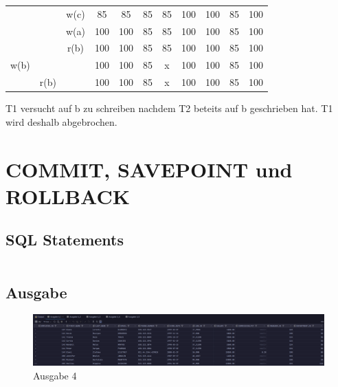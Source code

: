 \documentclass[12pt]{scrartcl}
\begin{document}
\begin{center}
\begin{tabular}{ | c | c | c | c | c | c | c | c | c | c | c | }
		     &      & w(c) & 85                        & 85                          & 85                          & 85                          & 100  & 100  & 85   & 100  \\
		     &      & w(a) & 100                       & 100                         & 85                          & 85                          & 100  & 100  & 85   & 100  \\
		     &      & r(b) & 100                       & 100                         & 85                          & 85                          & 100  & 100  & 85   & 100  \\
		w(b) &      &      & 100                       & 100                         & 85                          & x                           & 100  & 100  & 85   & 100  \\
		     & r(b) &      & 100                       & 100                         & 85                          & x                           & 100  & 100  & 85   & 100  \\
		\hline
	\end{tabular}
\end{center}

T1 versucht auf b zu schreiben nachdem T2 beteits auf b geschrieben hat. T1 wird deshalb abgebrochen.

\pagebreak

\section{COMMIT, SAVEPOINT und ROLLBACK}

\subsection{SQL Statements}
\inputminted{sql}{../ue6_4.sql}

\pagebreak

\subsection{Ausgabe}

\begin{figure}[H]
	\centering
	\includegraphics[width=1\textwidth]{../4_1.png}
	\caption{Ausgabe 4}
\end{figure}
\end{document}
